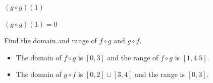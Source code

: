 \documentclass{ximera}
\begin{document}
\begin{question}
\begin{problem}
$(g \circ g)(1)$

\begin{solution}
     $(g \circ g)(1) = 0$
\end{solution}
\end{problem}

\begin{problem}\label{twofuncgraphcomplast}
Find the domain and range of $f \circ g$ and $g \circ f$.

\begin{solution}
    \begin{itemize} \item The domain of $f \circ g$ is $[0,3]$ and the range of $f \circ g$ is $[1, 4.5]$.
\item The domain of $g \circ f$ is $[0,2] \cup [3,4]$ and the range is $[0,3]$.

\end{itemize}
\end{solution}
\end{problem}

\end{question}
\end{document}
